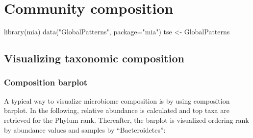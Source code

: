 \documentclass[
]{book}
\newenvironment{Shaded}{\begin{snugshade}}{\end{snugshade}}
\newcommand{\AttributeTok}[1]{\textcolor[rgb]{0.77,0.63,0.00}{#1}}
\newcommand{\FunctionTok}[1]{\textcolor[rgb]{0.00,0.00,0.00}{#1}}
\newcommand{\NormalTok}[1]{#1}
\newcommand{\OtherTok}[1]{\textcolor[rgb]{0.56,0.35,0.01}{#1}}
\newcommand{\StringTok}[1]{\textcolor[rgb]{0.31,0.60,0.02}{#1}}
\begin{document}
\hypertarget{microbiome-community}{%
\chapter{Community composition}\label{microbiome-community}}

\begin{Shaded}
\begin{Highlighting}[]
\FunctionTok{library}\NormalTok{(mia)}
\FunctionTok{data}\NormalTok{(}\StringTok{"GlobalPatterns"}\NormalTok{, }\AttributeTok{package=}\StringTok{"mia"}\NormalTok{)}
\NormalTok{tse }\OtherTok{\textless{}{-}}\NormalTok{ GlobalPatterns}
\end{Highlighting}
\end{Shaded}

\hypertarget{visual-composition}{%
\section{Visualizing taxonomic composition}\label{visual-composition}}

\hypertarget{composition-barplot}{%
\subsection{Composition barplot}\label{composition-barplot}}

A typical way to visualize microbiome composition is by using
composition barplot. In the following, relative abundance is
calculated and top taxa are retrieved for the Phylum rank. Thereafter,
the barplot is visualized ordering rank by abundance values and
samples by ``Bacteroidetes'':
\end{document}
